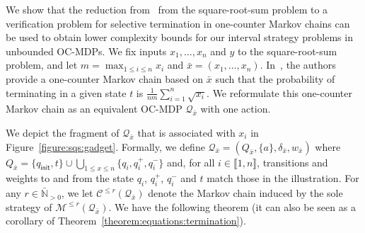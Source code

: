 \documentclass[a4paper,UKenglish,cleveref,autoref,thm-restate,colorlinks]{lipics-v2021}
\newcommand{\init}{\mathsf{init}}
\newcommand{\integerInterval}[1]{\llbracket{}#1\rrbracket{}}
\newcommand{\sqsx}{x} \newcommand{\sqsxVect}{\bar{x}} \newcommand{\sqsm}{m} \newcommand{\sqsy}{y} \newcommand{\sqsi}{i} \newcommand{\sqsn}{n} \newcommand{\sqsSize}{E}
\newcommand{\IN}{\mathbb{N}}
\newcommand{\INposBar}{\bar{\IN}_{>0}}
\newcommand{\mdp}{\mathcal{M}}
\newcommand{\weight}{w}
\newcommand{\ocmdp}{\mathcal{Q}}
\newcommand{\ocmdpFin}[2]{\mdp^{\leq #2}(#1)}
\newcommand{\ocStateSpace}{Q}
\newcommand{\ocState}{q}
\newcommand{\ocStateC}{t}
\newcommand{\ocAction}{a}
\newcommand{\ocTrans}{\delta}
\newcommand{\counterUB}{r}
\newcommand{\mchain}{\mathcal{C}}
\newcommand{\ocChainFin}[2]{\mchain^{\leq #2}(#1)}
\newcommand{\chainX}{\ocmdp_{\sqsxVect}}
\begin{document}
We show that the reduction from~\cite{DBLP:journals/pe/EtessamiWY10} from the square-root-sum problem to a verification problem for selective termination in one-counter Markov chains can be used to obtain lower complexity bounds for our interval strategy problems in unbounded OC-MDPs.
We fix inputs $\sqsx_1, \ldots, \sqsx_\sqsn$ and $\sqsy$ to the square-root-sum problem, and let $\sqsm = \max_{1\leq\sqsi\leq\sqsn}\sqsx_\sqsi$ and $\sqsxVect = (\sqsx_1,\ldots, \sqsx_\sqsn)$.
In~\cite{DBLP:journals/pe/EtessamiWY10}, the authors provide a one-counter Markov chain based on $\sqsxVect$ such that the probability of terminating in a given state $\ocStateC$ is $\frac{1}{\sqsn\sqsm}\sum_{\sqsi=1}^\sqsn\sqrt{\sqsx_\sqsi}$.
We reformulate this one-counter Markov chain as an equivalent OC-MDP $\chainX$ with one action.

We depict the fragment of $\chainX$ that is associated with $\sqsx_\sqsi$ in Figure~\ref{figure:sqs:gadget}.
Formally, we define $\chainX=(\ocStateSpace_{\sqsxVect}, \{\ocAction\}, \ocTrans_{\sqsxVect}, \weight_{\sqsxVect})$ where $\ocStateSpace_{\sqsxVect} = \{\ocState_\init, \ocStateC\}\cup\bigcup_{1\leq\sqsx\leq\sqsn}\{\ocState_\sqsi,\ocState_\sqsi^+,\ocState_\sqsi^-\}$ and, for all $\sqsi\in\integerInterval{1, \sqsn}$, transitions and weights to and from the state $\ocState_\sqsi$, $\ocState_\sqsi^+$, $\ocState_\sqsi^-$ and $\ocStateC$  match those in the illustration.
For any $\counterUB\in\INposBar$, we let $\ocChainFin{\chainX}{\counterUB}$ denote the Markov chain induced by the sole strategy of $\ocmdpFin{\chainX}{\counterUB}$.
We have the following theorem (it can also be seen as a corollary of Theorem~\ref{theorem:equations:termination}).
\end{document}
